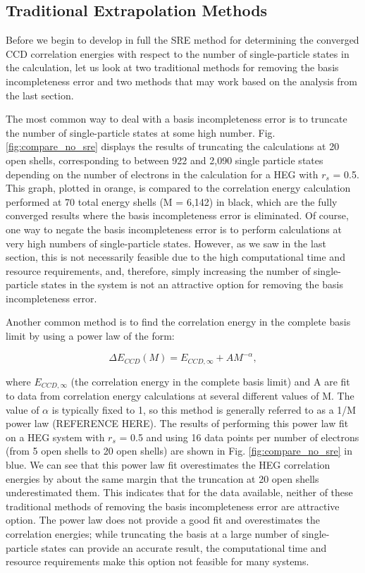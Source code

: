 \subsection*{Traditional Extrapolation Methods}
Before we begin to develop in full the SRE method for determining the converged CCD correlation energies with respect to the number of single-particle states in the calculation, let us look at two traditional methods for removing the basis incompleteness error and two methods that may work based on the analysis from the last section.

The most common way to deal with a basis incompleteness error is to truncate the number of single-particle states at some high number. Fig. \ref{fig:compare_no_sre} displays the results of truncating the calculations at 20 open shells, corresponding to between 922 and 2,090 single particle states depending on the number of electrons in the calculation for a HEG with $r_s$ = 0.5. This graph, plotted in orange, is compared to the correlation energy calculation performed at 70 total energy shells (M = 6,142) in black, which are the fully converged results where the basis incompleteness error is eliminated. Of course, one way to negate the basis incompleteness error is to perform calculations at very high numbers of single-particle states. However, as we saw in the last section, this is not necessarily feasible due to the high computational time and resource requirements, and, therefore, simply increasing the number of single-particle states in the system is not an attractive option for removing the basis incompleteness error.

Another common method is to find the correlation energy in the complete basis limit by using a power law of the form:

\begin{equation}
    \Delta E_{CCD}(M) = E_{CCD,\infty} + AM^{-\alpha},
\end{equation}

where $E_{CCD,\infty}$ (the correlation energy in the complete basis limit) and A are fit to data from correlation energy calculations at several different values of M. The value of $\alpha$ is typically fixed to 1, so this method is generally referred to as a 1/M power law (REFERENCE HERE). The results of performing this power law fit on a HEG system with $r_s$ = 0.5 and using 16 data points per number of electrons (from 5 open shells to 20 open shells) are shown in Fig. \ref{fig:compare_no_sre} in blue.  We can see that this power law fit overestimates the HEG correlation energies by about the same margin that the truncation at 20 open shells underestimated them. This indicates that for the data available, neither of these traditional methods of removing the basis incompleteness error are attractive option. The power law does not provide a good fit and overestimates the correlation energies; while truncating the basis at a large number of single-particle states can provide an accurate result, the computational time and resource requirements make this option not feasible for many systems.

